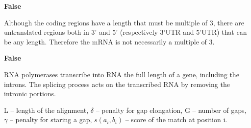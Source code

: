 \begin{Answer} [
   ref={ex20},
   number={20}
 ]

  \Question \textbf{False}

Although the coding regions have a length that must be multiple of 3, there are untranslated regions both in 3' and 5' (respectively 3'UTR and 5'UTR) that can be any length. Therefore the mRNA is not necessarily a multiple of 3.

\end{Answer}

\begin{Answer} [
   ref={ex21},
   number={21}
 ]

  \Question \textbf{False}

RNA polymerases transcribe into RNA the full length of a gene, including the introns. The splicing process acts on the transcribed RNA by removing the intronic portions.

\end{Answer}

\begin{Answer} [
   ref={ex22},
   number={22}
 ]

  \Question L – length of the alignment, $\delta$ – penalty for gap elongation,
G – number of gaps, $\gamma$ – penalty for staring a gap, $s(a_i, b_i)$ –
score of the match at position i.

\end{Answer}
